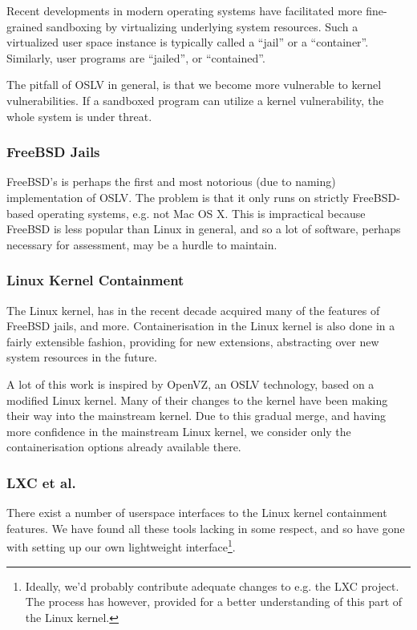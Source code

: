 Recent developments in modern operating systems have facilitated more
fine-grained sandboxing by virtualizing underlying system resources. Such a
virtualized user space instance is typically called a ``jail'' or a
``container''. Similarly, user programs are ``jailed'', or ``contained''.

The pitfall of OSLV in general, is that we become more vulnerable to kernel
vulnerabilities. If a sandboxed program can utilize a kernel vulnerability, the
whole system is under threat.

\subsubsection{FreeBSD Jails}

FreeBSD's \cite{man-8-jail} is perhaps the first and most notorious (due to
naming) implementation of OSLV. The problem is that it only runs on strictly
FreeBSD-based operating systems, e.g. not Mac OS X. This is impractical because
FreeBSD is less popular than Linux in general, and so a lot of software,
perhaps necessary for assessment, may be a hurdle to maintain.

\subsubsection{Linux Kernel Containment}

The Linux kernel, has in the recent decade acquired many of the features of
FreeBSD jails, and more. Containerisation in the Linux kernel is also done in a
fairly extensible fashion, providing for new extensions, abstracting over new
system resources in the future.

A lot of this work is inspired by OpenVZ, an OSLV technology, based on a
modified Linux kernel. Many of their changes to the kernel have been making
their way into the mainstream kernel\cite{kerrisk-2012}. Due to this gradual
merge, and having more confidence in the mainstream Linux kernel, we consider
only the containerisation options already available there.

\subsubsection{LXC et al.}

There exist a number of userspace interfaces to the Linux kernel containment
features. We have found all these tools lacking in some respect, and so have
gone with setting up our own lightweight interface\footnote{Ideally, we'd
probably contribute adequate changes to e.g. the LXC project. The process has
however, provided for a better understanding of this part of the Linux
kernel.}.

